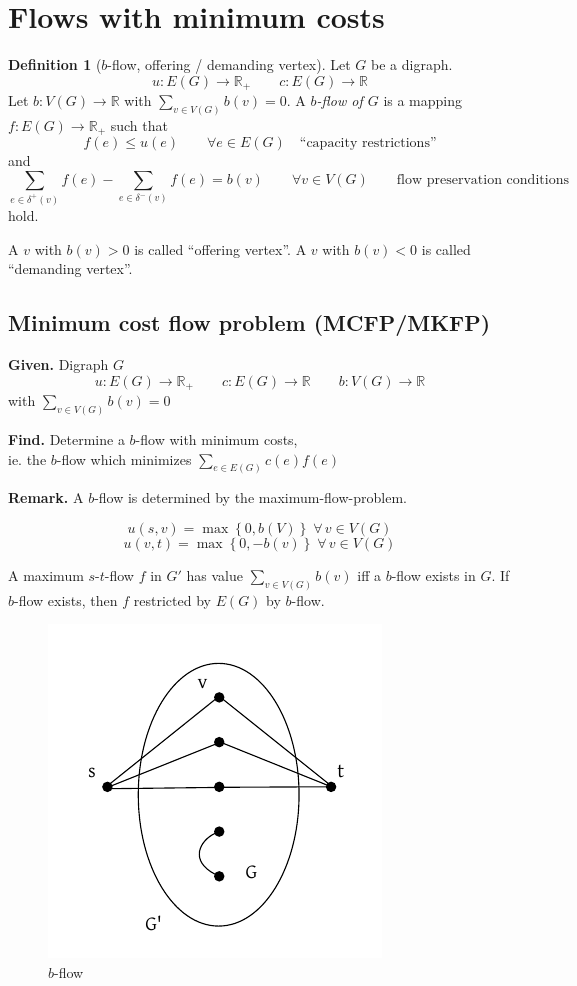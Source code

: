 \documentclass[a4paper]{article}
\theoremstyle{definition}
\newtheorem{definition}[theorem]{Definition}
\newcommand{\set}[1]{\left\{#1\right\}}
\newcommand{\given}[1]{\textbf{Given.} #1\par}
\newcommand{\find}[1]{\textbf{Find.} #1\par}
\newcommand{\flow}[2]{$#1$-$#2$-flow}
\newcommand{\fall}{\;\forall\,}
\begin{document}
\section{Flows with minimum costs}
%
\begin{definition}[$b$-flow, offering / demanding vertex]
  Let $G$ be a digraph.
  \[ u: E(G) \rightarrow \mathbb{R}_+ \qquad c: E(G) \rightarrow \mathbb{R} \]
  Let $b: V(G) \rightarrow \mathbb{R}$ with $\sum_{v \in V(G)} b(v) = 0$.
  A \emph{$b$-flow of $G$} is a mapping $f: E(G) \rightarrow \mathbb{R}_+$ such that
  \[ f(e) \leq u(e) \qquad \forall e \in E(G) \quad \text{``capacity restrictions''} \]
  and
  \[
    \sum_{e \in \delta^+(v)} f(e) - \sum_{e \in \delta^-(v)} f(e)
      = b(v) \qquad \forall v \in V(G)
      \qquad \text{flow preservation conditions}
  \]
  hold.

  A $v$ with $b(v) > 0$ is called \enquote{offering vertex}.
  A $v$ with $b(v) < 0$ is called \enquote{demanding vertex}.
\end{definition}


\subsection{Minimum cost flow problem (MCFP/MKFP)}
%
\given{Digraph $G$
\[ u: E(G) \rightarrow \mathbb{R}_+
  \qquad c: E(G) \rightarrow \mathbb{R}
  \qquad b: V(G) \rightarrow \mathbb{R}
\] with $\sum_{v \in V(G)} b(v) = 0$}
\find{Determine a $b$-flow with minimum costs, \\
  ie. the $b$-flow which minimizes $\sum_{e \in E(G)} c(e) f(e)$
}

\textbf{Remark.}
  A $b$-flow is determined by the maximum-flow-problem.

\[
  u(s, v) = \max{\set{0, b(V)}} \fall v \in V(G)
\] \[
  u(v, t) = \max{\set{0, -b(v)}} \fall v \in V(G)
\]

A maximum \flow st $f$ in $G'$ has value $\sum_{v \in V(G)} b(v)$
iff a $b$-flow exists in $G$. If $b$-flow exists, then $f$ restricted by $E(G)$ by $b$-flow.

\begin{figure}[ht]
 \begin{center}
  \includegraphics{img/b_flow.pdf}
  \caption{$b$-flow}
 \end{center}
\end{figure}
\end{document}
